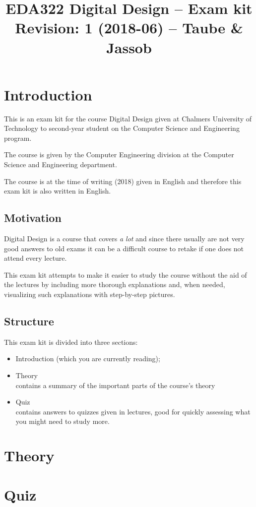 \documentclass{article}
\title{EDA322 Digital Design -- Exam kit \\
  \small Revision: 1 (2018-06) -- Taube \& Jassob
}
\begin{document}
\maketitle
\tableofcontents

\newpage

\section{Introduction}
This is an exam kit for the course Digital Design given at Chalmers
University of Technology to second-year student on the Computer
Science and Engineering program.

The course is given by the Computer Engineering division at the
Computer Science and Engineering department.

The course is at the time of writing (2018) given in English and
therefore this exam kit is also written in English.

\subsection{Motivation}
Digital Design is a course that covers {\it a lot} and since there
usually are not very good answers to old exams it can be a difficult
course to retake if one does not attend every lecture.

This exam kit attempts to make it easier to study the course without
the aid of the lectures by including more thorough explanations and,
when needed, visualizing such explanations with step-by-step pictures.

\subsection{Structure}

This exam kit is divided into three sections:
\begin{itemize}
\item Introduction (which you are currently reading);
\item Theory \\
  contains a summary of the important parts of the course's theory
\item Quiz \\
  contains answers to quizzes given in lectures, good for quickly
  assessing what you might need to study more.
\end{itemize}

\newpage

\section{Theory}
\section{Quiz}
\end{document}
